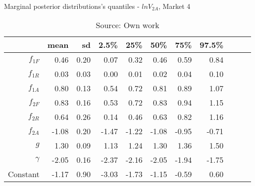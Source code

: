 \begin{table}[H]
\caption{Marginal posterior distributions's quantiles - $ln V_{2A}$,  Market 4}
\centering
\begin{tabular}{rrrrrrrrrrr}
  \toprule
           & mean  & sd   & 2.5\% & 25\%  & 50\%  & 75\%  & 97.5\% \\ 
  \hline
  $f_{1F}$ & 0.46  & 0.20 & 0.07  & 0.32  & 0.46  & 0.59  & 0.84  \\ 
  $f_{1R}$ & 0.03  & 0.03 & 0.00  & 0.01  & 0.02  & 0.04  & 0.10  \\ 
  $f_{1A}$ & 0.80  & 0.13 & 0.54  & 0.72  & 0.81  & 0.89  & 1.07  \\ 
  $f_{2F}$ & 0.83  & 0.16 & 0.53  & 0.72  & 0.83  & 0.94  & 1.15  \\ 
  $f_{2R}$ & 0.64  & 0.26 & 0.14  & 0.46  & 0.63  & 0.82  & 1.16  \\ 
  $f_{2A}$ & -1.08 & 0.20 & -1.47 & -1.22 & -1.08 & -0.95 & -0.71 \\ 
  $g$      & 1.30  & 0.09 & 1.13  & 1.24  & 1.30  & 1.36  & 1.50  \\ 
  $\gamma$ & -2.05 & 0.16 & -2.37 & -2.16 & -2.05 & -1.94 & -1.75 \\ 
  Constant & -1.17 & 0.90 & -3.03 & -1.73 & -1.15 & -0.59 & 0.60  \\ 
     \bottomrule
\end{tabular}
\caption*{Source: Own work}
\end{table}
